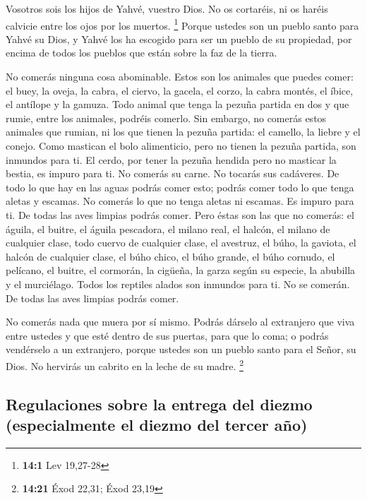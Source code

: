 \begin{paracol}{2}
 Vosotros sois los hijos de Yahvé, vuestro Dios. No os
cortaréis, ni os haréis calvicie entre los ojos por los muertos.
\footnote{\textbf{14:1} Lev 19,27-28}  Porque ustedes son
un pueblo santo para Yahvé su Dios, y Yahvé los ha escogido para ser un
pueblo de su propiedad, por encima de todos los pueblos que están sobre
la faz de la tierra.

 No comerás ninguna cosa abominable.  Estos
son los animales que puedes comer: el buey, la oveja, la cabra,
 el ciervo, la gacela, el corzo, la cabra montés, el
íbice, el antílope y la gamuza.  Todo animal que tenga la
pezuña partida en dos y que rumie, entre los animales, podréis comerlo.
 Sin embargo, no comerás estos animales que rumian, ni los
que tienen la pezuña partida: el camello, la liebre y el conejo. Como
mastican el bolo alimenticio, pero no tienen la pezuña partida, son
inmundos para ti.  El cerdo, por tener la pezuña hendida
pero no masticar la bestia, es impuro para ti. No comerás su carne. No
tocarás sus cadáveres.  De todo lo que hay en las aguas
podrás comer esto; podrás comer todo lo que tenga aletas y escamas.
 No comerás lo que no tenga aletas ni escamas. Es impuro
para ti.  De todas las aves limpias podrás comer.
 Pero éstas son las que no comerás: el águila, el buitre,
el águila pescadora,  el milano real, el halcón, el
milano de cualquier clase,  todo cuervo de cualquier
clase,  el avestruz, el búho, la gaviota, el halcón de
cualquier clase,  el búho chico, el búho grande, el búho
cornudo,  el pelícano, el buitre, el cormorán,
 la cigüeña, la garza según su especie, la abubilla y el
murciélago.  Todos los reptiles alados son inmundos para
ti. No se comerán.  De todas las aves limpias podrás
comer.

 No comerás nada que muera por sí mismo. Podrás dárselo
al extranjero que viva entre ustedes y que esté dentro de sus puertas,
para que lo coma; o podrás vendérselo a un extranjero, porque ustedes
son un pueblo santo para el Señor, su Dios. No hervirás un cabrito en la
leche de su madre. \footnote{\textbf{14:21} Éxod 22,31; Éxod 23,19}

\hypertarget{regulaciones-sobre-la-entrega-del-diezmo-especialmente-el-diezmo-del-tercer-auxf1o}{%
\subsection{Regulaciones sobre la entrega del diezmo (especialmente el
diezmo del tercer
año)}\label{regulaciones-sobre-la-entrega-del-diezmo-especialmente-el-diezmo-del-tercer-auxf1o}}


\end{paracol}

